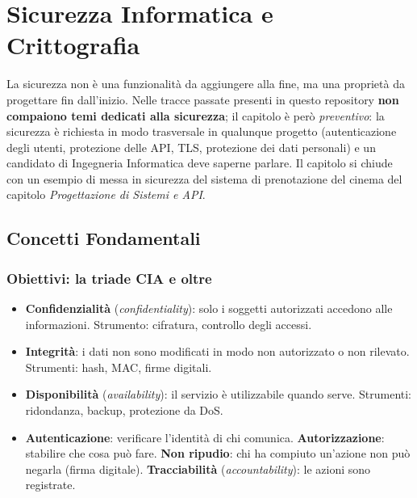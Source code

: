 \chapter{Sicurezza Informatica e Crittografia}

La sicurezza non è una funzionalità da aggiungere alla fine, ma una proprietà da progettare fin dall'inizio. Nelle tracce passate presenti in questo repository \textbf{non compaiono temi dedicati alla sicurezza}; il capitolo è però \emph{preventivo}: la sicurezza è richiesta in modo trasversale in qualunque progetto (autenticazione degli utenti, protezione delle API, TLS, protezione dei dati personali) e un candidato di Ingegneria Informatica deve saperne parlare. Il capitolo si chiude con un esempio di messa in sicurezza del sistema di prenotazione del cinema del capitolo \emph{Progettazione di Sistemi e API}.

\section{Concetti Fondamentali}

\subsection{Obiettivi: la triade CIA e oltre}
\begin{itemize}
    \item \textbf{Confidenzialità} (\emph{confidentiality}): solo i soggetti autorizzati accedono alle informazioni. Strumento: cifratura, controllo degli accessi.
    \item \textbf{Integrità}: i dati non sono modificati in modo non autorizzato o non rilevato. Strumenti: hash, MAC, firme digitali.
    \item \textbf{Disponibilità} (\emph{availability}): il servizio è utilizzabile quando serve. Strumenti: ridondanza, backup, protezione da DoS.
    \item \textbf{Autenticazione}: verificare l'identità di chi comunica. \textbf{Autorizzazione}: stabilire che cosa può fare. \textbf{Non ripudio}: chi ha compiuto un'azione non può negarla (firma digitale). \textbf{Tracciabilità} (\emph{accountability}): le azioni sono registrate.
\end{itemize}

